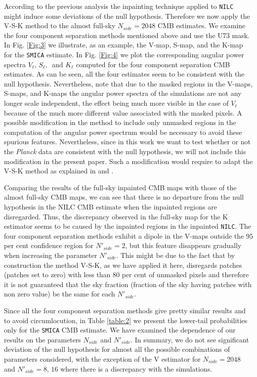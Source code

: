 According to the previous analysis the inpainting technique applied to \texttt{NILC} might induce some deviations of the null hypothesis. Therefore we now apply the V-S-K method to the almost full-sky $N_{side}=2048$ CMB estimates. We examine the four component separation methods mentioned above and use the U73 mask. In Fig. \ref{Fig:3} we illustrate, as an example, the V-map, S-map, and the K-map for the \texttt{SMICA} estimate. In Fig. \ref{Fig:4} we plot the corresponding angular power spectra $V_{\ell},\, S_{\ell},\, $ and $K_{\ell}$ computed for the four component separation CMB estimates. As can be seen, all the four estimates seem to be consistent with the null hypothesis. Nevertheless, note that due to the masked regions in the V-maps, S-maps, and K-maps the angular power spectra of the simulations are not any longer scale independent, the effect being much more visible in the case of $V_{\ell}$ because of the much more different value associated with the masked pixels. A possible modification in the method to include only unmasked regions in the computation of the angular power spectrum would be necessary to avoid these spurious features. Nevertheless, since in this work we want to test whether or not the \textit{Planck} data are consistent with the null hypothesis, we will not include  this modification in the present paper. Such a modification would require to adapt the V-S-K method as explained in \cite{Gorski1994} and \cite{Hivon2002}.

Comparing the results of the full-sky inpainted CMB maps with those of the almost full-sky CMB maps, we can see that there is no departure from the null hypothesis in the NILC CMB estimate when the inpainted regions are disregarded. Thus, the discrepancy observed in the full-sky map for the K estimator seems to be caused by the inpainted regions in the inpainted \texttt{NILC}. The four component separation methods exhibit a dipole in the V-maps outside the $95$ per cent confidence region for $N'_{side}=2$, but this feature disappears gradually  when increasing the parameter $N'_{side}$. This might be due to the fact that by construction the method V-S-K, as we have applied it here, disregards patches (patches set to zero) with less than $80$ per cent of unmasked pixels and therefore it is not guaranteed that the sky fraction (fraction of the sky having patches with non zero value) be the same for each $N'_{side}$. 

Since all the four component separation methods give pretty similar results and to avoid circumlocution, in Table \ref{table:2} we present the lower-tail probabilities only for the \texttt{SMICA} CMB estimate. We have examined the dependence of our results on the parameters $N_{side}$ and $N'_{side}$. In summary, we do not see significant deviation of the null hypothesis for almost all the possible combinations of parameters considered, with the exception of the V estimator for $N_{side}=2048$ and $N'_{side}=8,\,16$ where there is a discrepancy with the simulations.
 


